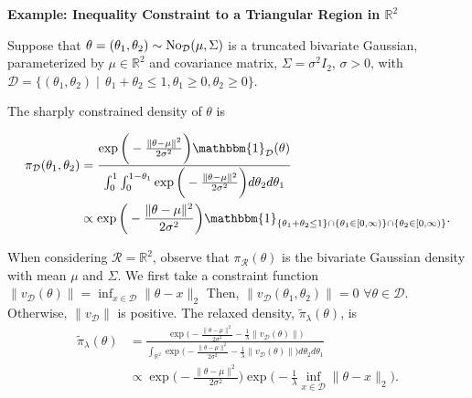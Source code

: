 \documentclass[10pt,fleqn]{article}
\newcommand{\bb}[1]{\mathbb{#1}} \newcommand{\mc}[1]{\mathcal{#1}}
\DeclareMathOperator{\1}{\mathbbm{1}} \DeclareMathOperator{\bigO}{\mc O}
\begin{document}
\newpage

\textbf{Example: Inequality Constraint to a Triangular Region in $\mathbb{R}^2$ }

Suppose that $\theta = (\theta_1,\theta_2)\sim \No_{\mc D}(\mu, \Sigma)$
is a truncated bivariate Gaussian, parameterized by $\mu \in\mathbb{R}^2$
and covariance matrix, $\Sigma = \sigma^2
I_2$, $\sigma > 0$, with $\mathcal{D} = \{(\theta_1,\theta_2) \mid
\, \theta_1+\theta_2\le 1, \theta_1\ge0, \theta_2 \ge 0\}.$

The sharply constrained density of $\theta$ is

\begin{align*}
\pi_\mathcal{D}(\theta_1,\theta_2) & =
\frac{\exp\bigg(-\frac{\|\theta-\mu\|^2}{2\sigma^2}\bigg)\mathbbm{1}_\mathcal{D}(\theta)}{\int_0^1\int_0^{1-\theta_1}\exp\bigg(-\frac{\|\theta-\mu\|^2}{2\sigma^2}\bigg)d\theta_2d\theta_1}
\\
& \propto
\exp\bigg(-\frac{\|\theta-\mu\|^2}{2\sigma^2}\bigg)
\mathbbm{1}_{\{\theta_1+\theta_2\le 1\}\cap \{\theta_1 \in
[0,\infty)\}\cap \{\theta_2\in[0,\infty)\}} .\end{align*}

When considering $\mc R=\bb R^2$, observe that $\pi_{\mc R}(\theta)$ is the
bivariate Gaussian density with mean $\mu$ and $\Sigma$. We first take a
constraint function 
$\|v_{\mc D}(\theta)\| =
\inf_{x\in\mathcal{D}} \|\theta-x\|_2
$
Then, $\|v_{\mc D}(\theta_1,\theta_2)\| = 0$ $\forall \theta\in\mathcal{D}$.
Otherwise, $\|v_{\mc D}\|$ is positive. The relaxed density,
$\tilde{\pi}_\lambda(\theta)$, is \begin{equation} \begin{split}
\tilde{\pi}_\lambda(\theta)
&=\frac{\exp\bigg(-\frac{\|\theta-\mu\|^2}{2\sigma^2} -
\frac{1}{\lambda} \| v_{\mc D}(\theta)\|
\bigg)}{\int_{\mathbb{R}^2}
\exp\bigg(-\frac{\|\theta-\mu\|^2}{2\sigma^2}-\frac{1}{\lambda}\|v_{\mc
D}(\theta)\|
\bigg)d\theta_2d\theta_1}\\ & \propto
\exp\bigg(-\frac{\|\theta-\mu\|^2}{2\sigma^2}\bigg)\exp\bigg(
- \frac{1}{\lambda}\inf_{x\in\mathcal{D}} \|\theta-x\|_2\bigg).  \end{split}
\label{EQ:Relaxed_Density_Bivariate_Normal_Triangle} \end{equation}
\end{document}
